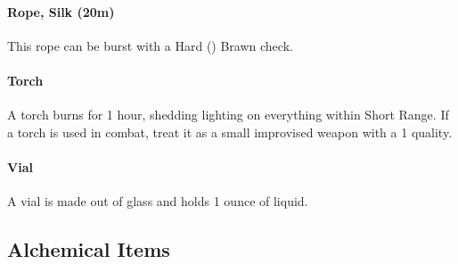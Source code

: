 \begin{multicols}{2}
\paragraph{Rope, Silk (20m)} \label{advitm:rope_silk}
This rope can be burst with a Hard (\difficulty\difficulty\difficulty\setback)
Brawn check.

\paragraph{Torch} \label{advitm:torch}
A torch burns for 1 hour, shedding lighting on
everything within Short Range.
If a torch is used in combat, treat it as a small
improvised weapon with a  1 quality.

\paragraph{Vial} \label{advitm:vial}
A vial is made out of glass and holds 1 ounce of liquid.

\end{multicols}
\hrulefill

\subsection{Alchemical Items}

